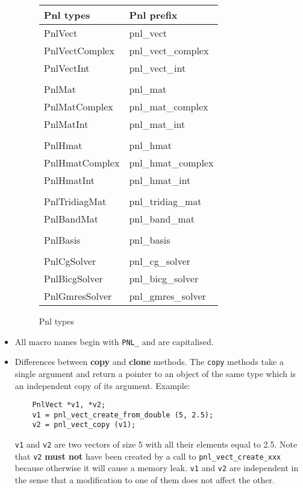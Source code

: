 \documentclass[a4paper,11pt,twoside]{article}
\begin{document}
\begin{itemize}
    \begin{figure}[h!]
      \centering\begin{tabular}{|l|l|}
      \hline
      Pnl types & Pnl prefix \\
      \hline
      PnlVect & pnl_vect \\
      PnlVectComplex & pnl_vect_complex \\
      PnlVectInt & pnl_vect_int \\
       &\\
      PnlMat & pnl_mat \\
      PnlMatComplex & pnl_mat_complex \\
      PnlMatInt & pnl_mat_int \\
      & \\
      PnlHmat & pnl_hmat \\
      PnlHmatComplex & pnl_hmat_complex \\
      PnlHmatInt & pnl_hmat_int \\
      & \\
      PnlTridiagMat & pnl_tridiag_mat \\
      PnlBandMat & pnl_band_mat \\
      & \\
      PnlBasis & pnl_basis \\
      & \\
      PnlCgSolver & pnl_cg_solver \\
      PnlBicgSolver & pnl_bicg_solver \\
      PnlGmresSolver & pnl_gmres_solver \\
      \hline
    \end{tabular}
    \caption{Pnl types}
    \label{pnltypes}
  \end{figure}

  \item All macro names begin with \verb!PNL_! and are capitalised.

  \item Differences between \textbf{copy} and \textbf{clone} methods.
    The \verb!copy! methods take a single argument and return a pointer to an object
    of the same type which is an independent copy of its argument. 
    Example:
    \begin{verbatim}
    PnlVect *v1, *v2;
    v1 = pnl_vect_create_from_double (5, 2.5);
    v2 = pnl_vect_copy (v1);
    \end{verbatim}
    \verb!v1! and \verb!v2! are two vectors of size 5 with all their elements
    equal to 2.5. Note that \verb!v2! {\bf must not} have been created by a call
    to \verb!pnl_vect_create_xxx! because otherwise it will cause a memory leak.
    \verb!v1! and \verb!v2! are independent in the sense that a modification to
    one of them does not affect the other.


\end{itemize}
\end{document}
